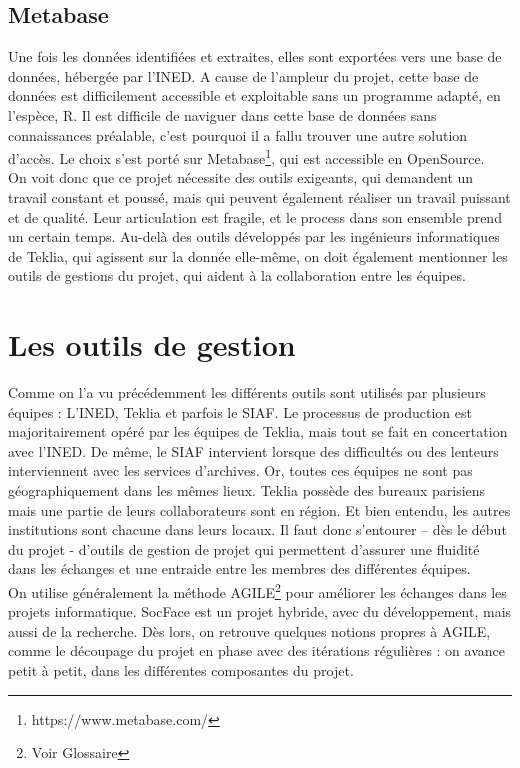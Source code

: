         \subsection{Metabase}
Une fois les données identifiées et extraites, elles sont exportées vers une base de données, hébergée par l’\gls{INED}. A cause de l’ampleur du projet, cette base de données est difficilement accessible et exploitable sans un programme adapté, en l’espèce, R. Il est difficile de naviguer dans cette base de données sans connaissances préalable, c’est pourquoi il a fallu trouver une autre solution d'accès. Le choix s’est porté sur Metabase\footnote{https://www.metabase.com/}, qui est accessible en OpenSource.\\

On voit donc que ce projet nécessite des outils exigeants, qui demandent un travail constant et poussé, mais qui peuvent également réaliser un travail puissant et de qualité. Leur articulation est fragile, et le process dans son ensemble prend un certain temps. Au-delà des outils développés par les ingénieurs informatiques de Teklia, qui agissent sur la donnée elle-même, on doit également mentionner les outils de gestions du projet, qui aident à la collaboration entre les équipes.  

    \section{Les outils de gestion}

Comme on l'a vu précédemment les différents outils sont utilisés par plusieurs équipes : L’\gls{INED}, Teklia et parfois le \gls{SIAF}. Le processus de production est majoritairement opéré par les équipes de Teklia, mais tout se fait en concertation avec l’INED. De même, le SIAF intervient lorsque des difficultés ou des lenteurs interviennent avec les services d’archives. Or, toutes ces équipes ne sont pas géographiquement dans les mêmes lieux. Teklia possède des bureaux parisiens mais une partie de leurs collaborateurs sont en région. Et bien entendu, les autres institutions sont chacune dans leurs locaux. Il faut donc s’entourer – dès le début du projet - d’outils de gestion de projet qui permettent d’assurer une fluidité dans les échanges et une entraide entre les membres des différentes équipes.\\ 
On utilise généralement la méthode \gls{AGILE}\footnote{Voir Glossaire} pour améliorer les échanges dans les projets informatique. SocFace est un projet hybride, avec du développement, mais aussi de la recherche. Dès lors, on retrouve quelques notions propres à AGILE, comme le découpage du projet en phase avec des itérations régulières : on avance petit à petit, dans les différentes composantes du projet. 

